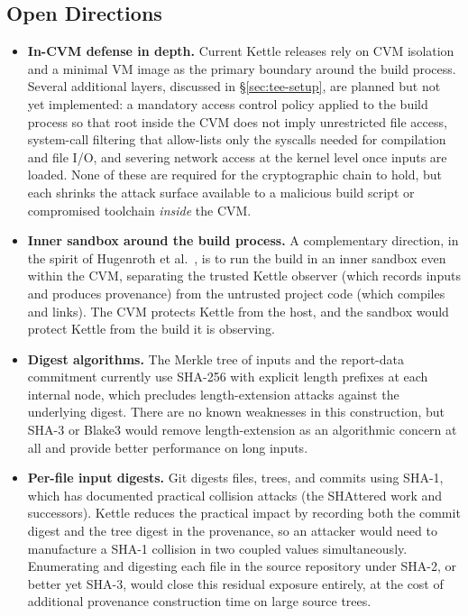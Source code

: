 \documentclass[11pt]{article}
\begin{document}
\subsection{Open Directions}
\label{sec:open-directions}

\begin{itemize}
\item \textbf{In-CVM defense in depth.} Current Kettle releases rely on CVM isolation and a minimal VM image as the primary boundary around the build process. Several additional layers, discussed in \S\ref{sec:tee-setup}, are planned but not yet implemented: a mandatory access control policy applied to the build process so that root inside the CVM does not imply unrestricted file access, system-call filtering that allow-lists only the syscalls needed for compilation and file I/O, and severing network access at the kernel level once inputs are loaded. None of these are required for the cryptographic chain to hold, but each shrinks the attack surface available to a malicious build script or compromised toolchain \emph{inside} the CVM.
\item \textbf{Inner sandbox around the build process.} A complementary direction, in the spirit of Hugenroth et al.~\cite{ref:hugenroth}, is to run the build in an inner sandbox even within the CVM, separating the trusted Kettle observer (which records inputs and produces provenance) from the untrusted project code (which compiles and links). The CVM protects Kettle from the host, and the sandbox would protect Kettle from the build it is observing.
\item \textbf{Digest algorithms.} The Merkle tree of inputs and the report-data commitment currently use SHA-256 with explicit length prefixes at each internal node, which precludes length-extension attacks against the underlying digest. There are no known weaknesses in this construction, but SHA-3 or Blake3 would remove length-extension as an algorithmic concern at all and provide better performance on long inputs.
\item \textbf{Per-file input digests.} Git digests files, trees, and commits using SHA-1, which has documented practical collision attacks (the SHAttered work and successors). Kettle reduces the practical impact by recording both the commit digest and the tree digest in the provenance, so an attacker would need to manufacture a SHA-1 collision in two coupled values simultaneously. Enumerating and digesting each file in the source repository under SHA-2, or better yet SHA-3, would close this residual exposure entirely, at the cost of additional provenance construction time on large source trees.
\end{itemize}
\end{document}
